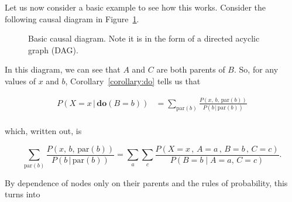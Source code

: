 \documentclass{article}
\begin{document}
Let us now consider a basic example to see how this works. Consider the following causal diagram in Figure~\ref{fig:causal_dia}.

\begin{figure}[h]
    \centering
    \caption{Basic causal diagram. Note it is in the form of a directed acyclic graph (DAG).}
    \label{fig:causal_dia}
\end{figure}

In this diagram, we can see that $A$ and $C$ are both parents of $B$. So, for any values of $x$ and $b$, 
Corollary~\ref{corollary:do} tells us that

\begin{align*}
    P(X = x \,|\, \textbf{do}(B=b)) &= \sum_{\text{par}(b)}\frac{P(x, \,b, \,\text{par}(b))}{P(b\,|\, \text{par}(b))} \\
\end{align*}

which, written out, is 

\begin{equation*}
    \sum_{\text{par}(b)}\frac{P(x, \,b, \,\text{par}(b))}{P(b\,|\, \text{par}(b))} = \sum_{a}\sum_{c}\frac{P(X=x\,, \, A=a\,,\, B=b \, ,\, C=c)}{P(B=b \;|\; A=a,\, C=c)}.
\end{equation*}

By dependence of nodes only on their parents and the rules of probability, this turns into
\end{document}
